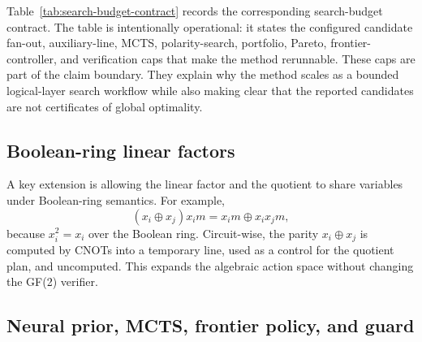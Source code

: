 \documentclass[11pt]{article}
\newcommand{\method}{Resource-NMCTS}
\newcommand{\xor}{\ensuremath{\oplus}}
\begin{document}
\begin{table}[H]
\centering
\scriptsize
\setlength{\tabcolsep}{2pt}
\renewcommand{\arraystretch}{1.05}
\caption{Algorithm contract for \method{}.  The table converts the method
description into implementation-anchored operational rules and reviewer-facing
guarantees.}
\label{tab:algorithm-contract}

\end{table}

Table~\ref{tab:search-budget-contract} records the corresponding search-budget
contract.  The table is intentionally operational: it states the configured
candidate fan-out, auxiliary-line, MCTS, polarity-search, portfolio, Pareto,
frontier-controller, and verification caps that make the method rerunnable.
These caps are part of the claim boundary.  They explain why the method scales
as a bounded logical-layer search workflow while also making clear that the
reported candidates are not certificates of global optimality.

\begin{table}[H]
\centering
\scriptsize
\setlength{\tabcolsep}{2pt}
\renewcommand{\arraystretch}{1.05}
\caption{Search-budget contract for \method{}.  Each row states the explicit
cap used to make the search rerunnable, the scalability role of that cap, and
the limitation it leaves in place.}
\label{tab:search-budget-contract}

\end{table}

\subsection{Boolean-ring linear factors}

A key extension is allowing the linear factor and the quotient to share
variables under Boolean-ring semantics.  For example,
\begin{equation}
  (x_i\xor x_j)x_i m = x_i m \xor x_i x_j m,
  \label{eq:boolean-ring}
\end{equation}
because $x_i^2=x_i$ over the Boolean ring.  Circuit-wise, the parity
$x_i\xor x_j$ is computed by CNOTs into a temporary line, used as a control for
the quotient plan, and uncomputed.  This expands the algebraic action space
without changing the GF(2) verifier.

\subsection{Neural prior, MCTS, frontier policy, and guard}
\end{document}
